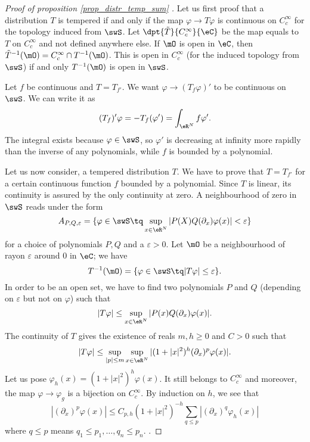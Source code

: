 \begin{proof}[Proof of proposition \ref{prop_distr_temp_sum} ]
Let us first proof that a distribution $T$ is tempered if and only if the map $\varphi\to T\varphi$ is continuous on $ C^{\infty}_c$ for the topology induced from $\swS$. Let $\dpt{\tilde T}{ C^{\infty}_c}{\eC}$ be the map equals to $T$ on $ C^{\infty}_c$ and not defined anywhere else. If $\mO$ is open in $\eC$, then $\tilde T^{-1}(\mO)= C^{\infty}_c\cap T^{-1}(\mO)$. This is open in $ C^{\infty}_c$ (for the induced topology from $\swS$) if and only $T^{-1}(\mO)$ is open in $\swS$.


Let $f$ be continuous and $T=T_{f'}$. We want $\varphi\to(T_f\varphi)'$ to be continuous on $\swS$. We can write it as
\[ 
  (T_f)'\varphi=-T_f(\varphi')=\int_{\eR^N}f\varphi'.
\]
The integral exists because $\varphi\in\swS$, so $\varphi'$ is decreasing at infinity more rapidly than the inverse of any polynomials, while $f$ is bounded by a polynomial.

Let us now consider, a tempered distribution $T$. We have to prove that $T=T_{f'}$ for a certain continuous function $f$ bounded by a polynomial. Since $T$ is linear, its continuity is assured by the only continuity at zero. A neighbourhood of zero in $\swS$ reads under the form
\[ 
  A_{P,Q,\varepsilon}=\{ \varphi\in\swS\tq \sup_{x\in\eR^N}| P(X)Q(\partial_x)\varphi(x) |<\varepsilon \}
\]
for a choice of polynomials $P,Q$ and a $\varepsilon>0$. Let $\mO$ be a neighbourhood of rayon $\varepsilon$ around $0$ in $\eC$; we have
\[ 
  T^{-1}(\mO)=\{ \varphi\in\swS\tq | T\varphi |\leq \varepsilon \}.
\]
In order to be an open set, we have to find two polynomials $P$ and $Q$ (depending on $\varepsilon$ but not on $\varphi$) such that 
\[ 
  | T\varphi |\leq \sup_{x\in\eR^N}| P(x)Q(\partial_x)\varphi(x) |.
\]
The continuity of $T$ gives the existence of reals $m,h\geq 0$ and $C>0$ such that
\[ 
  | T\varphi |\leq \sup_{| p |\leq m}\sup_{x\in\eR^N}| (1+| x |^2)^h(\partial_x)^p\varphi(x) |.
\]
Let us pose $\varphi_h(x)=(1+| x |^2)^h\varphi(x)$. It still belongs to $   C^{\infty}_c$ and moreover, the map $\varphi\to\varphi_g$ is a bijection on $ C^{\infty}_c$. By induction on $h$, we see that
\begin{equation}
  | (\partial_x)^p\varphi(x) |\leq C_{p,h}(1+| x |^2)^{-h}\sum_{q\leq p}| (\partial_x)^q\varphi_h(x) |
\end{equation}
where $q\leq p$ means $q_1\leq p_1,\ldots, q_n\leq p_n$.
 .

\end{proof}


